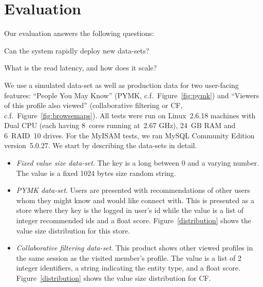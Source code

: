 \section{Evaluation}
\label{sec:evaluation}

Our evaluation answers the following questions:
\begin{compactenum}
\item Can the system rapidly deploy new data-sets?
\item What is the read latency, and how does it scale?
\end{compactenum}

We use a simulated data-set as well as production data for two
user-facing features: ``People You May Know'' (PYMK,
c.f.~Figure~\ref{fig:pymk}) and ``Viewers of this profile also
viewed'' (collaborative filtering or CF,
c.f.~Figure~\ref{fig:browsemaps}). All tests were run on Linux~2.6.18
machines with Dual CPU (each having 8~cores running at~2.67 GHz),
24~GB RAM and 6~RAID~10 drives. For the MyISAM tests, we ran MySQL
Community Edition version~5.0.27. We start by describing the data-sets
in detail.

\begin{itemize}
\item \emph{Fixed value size data-set}. The key is a long between
0 and a varying number. The value is a fixed 1024 bytes size random
string. 
\item \emph{PYMK data-set}. Users are presented with recommendations
of other users whom they might know and would like connect with. This
is presented as a store where they key is the logged in user's id
while the value is a list of integer recommended ids and a float
score. Figure~\ref{distribution} shows the value size distribution for
this store. 
\item \emph{Collaborative filtering data-set}. This product shows
other viewed profiles in the same session as the visited member's
profile. The value is a list of 2 integer identifiers, a string
indicating the entity type, and a float score.
Figure~\ref{distribution} shows the value size distribution for CF. 
\end{itemize}

